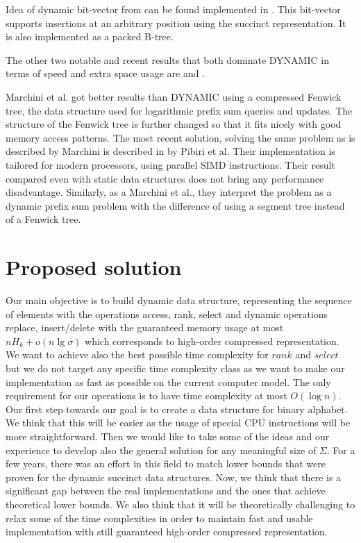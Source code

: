 Idea of dynamic bit-vector from \cite{policriti2015average} can be found implemented in \cite{ds-bitvector}. This bit-vector supports insertions at an arbitrary position using the succinct representation. It is also implemented as a packed B-tree.

The other two notable and recent results that both dominate DYNAMIC in terms of speed and extra space usage are \cite{marchini2020compact} and \cite{pibiri2020rank}.

Marchini et al. got better results than DYNAMIC using a compressed Fenwick tree\cite{marchini2020compact}, the data structure used for logarithmic prefix sum queries and updates\cite{fenwick1994new}. The structure of the Fenwick tree is further changed so that it fits nicely with good memory access patterns. The most recent solution, solving the same problem as is described by Marchini is described in \cite{pibiri2020rank} by Pibiri et al. Their implementation is tailored for modern processors, using parallel SIMD instructions. Their result compared even with static data structures does not bring any performance disadvantage. Similarly, as a Marchini et al., they interpret the problem as a dynamic prefix sum problem with the difference of using a segment tree instead of a Fenwick tree.

\section{Proposed solution}

Our main objective is to build dynamic data structure, representing the sequence of elements with the operations access, rank, select and dynamic operations replace, insert/delete with the guaranteed memory usage at most $nH_k+o(n\lg\sigma)$ which corresponds to high-order compressed representation. We want to achieve also the best possible time complexity for $rank$ and $select$ but we do not target any specific time complexity class as we want to make our implementation as fast as possible on the current computer model. The only requirement for our operations is to have time complexity at most $O(\log n)$. Our first step towards our goal is to create a data structure for binary alphabet. We think that this will be easier as the usage of special CPU instructions will be more straightforward. Then we would like to take some of the ideas and our experience to develop also the general solution for any meaningful size of $\Sigma$. For a few years, there was an effort in this field to match lower bounds that were proven for the dynamic succinct data structures. Now, we think that there is a significant gap between the real implementations and the ones that achieve theoretical lower bounds. We also think that it will be theoretically challenging to relax some of the time complexities in order to maintain fast and usable implementation with still guaranteed high-order compressed representation.

